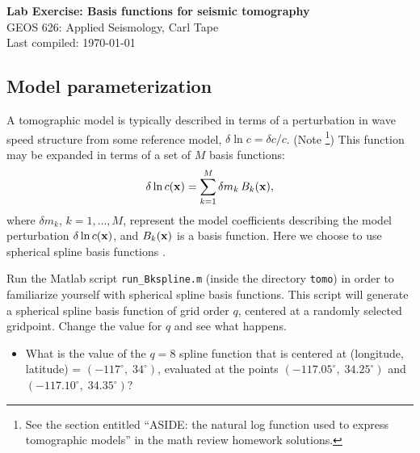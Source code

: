 \documentclass[11pt,titlepage,fleqn]{article}
\begin{document}

\begin{spacing}{1.2}
\centering
{\large \bf Lab Exercise: Basis functions for seismic tomography} \\
GEOS 626: Applied Seismology, Carl Tape \\
Last compiled: \today
\end{spacing}


\subsection*{Model parameterization}

A tomographic model is typically described in terms of a perturbation in wave speed structure from some reference model, \ie $\delta\ln c = \delta c/c$.
(Note \footnote{See the section entitled ``ASIDE: the natural log function used to express tomographic models'' in the math review homework solutions.})
This function may be expanded in terms of a set of $M$ basis functions:
%
\begin{equation}
\delta\ln c(\mbox{${\bf x}$})=\sum_{k=1}^M \delta m_k\,B_k(\mbox{${\bf x}$}),
\label{dlnv}
\end{equation}
%
where $\delta m_k$, $k=1,\ldots,M$, represent the model coefficients describing the model perturbation $\delta\ln c(\mbox{${\bf x}$})$, and $B_k(\mbox{${\bf x}$})$ is a basis function. Here we choose to use spherical spline basis functions \citep{WangDahlen1995spline,Wang1998}.

Run the Matlab script \verb+run_Bkspline.m+ (inside the directory \verb+tomo+) in order to familiarize yourself with spherical spline basis functions. This script will generate a spherical spline basis function of grid order $q$, centered at a randomly selected gridpoint. Change the value for $q$ and see what happens. 

\begin{itemize}
\item What is the value of the $q=8$ spline function that is centered at (longitude, latitude) = $(-117^\circ,\;34^\circ)$, evaluated at the points $(-117.05^\circ,\;34.25^\circ)$ and $(-117.10^\circ,\;34.35^\circ)$?
\end{itemize}

\end{document}
